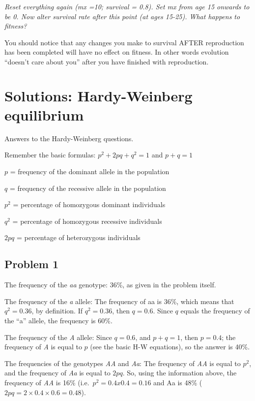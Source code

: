 \documentclass[
  a4paper]{book}
\begin{document}
\emph{Reset everything again (mx =10; survival = 0.8). Set mx from age 15 onwards to be 0. Now alter survival rate after this point (at ages 15-25). What happens to fitness?}

You should notice that any changes you make to survival AFTER reproduction has been completed will have no effect on fitness. In other words evolution ``doesn't care about you'' after you have finished with reproduction.

\section{Solutions: Hardy-Weinberg equilibrium}\label{solutions-hardy-weinberg-equilibrium}

Answers to the Hardy-Weinberg questions.

Remember the basic formulas:
\(p^2 + 2pq + q^2 = 1\) and \(p + q = 1\)

\(p\) = frequency of the dominant allele in the population

\(q\) = frequency of the recessive allele in the population

\(p^2\) = percentage of homozygous dominant individuals

\(q^2\) = percentage of homozygous recessive individuals

\(2pq\) = percentage of heterozygous individuals

\subsection{Problem 1}\label{problem-1}

The frequency of the \emph{aa} genotype: 36\%, as given in the problem itself.

The frequency of the \emph{a} allele: The frequency of aa is 36\%, which means that \(q^2 = 0.36\), by definition. If \(q^2 = 0.36\), then \(q = 0.6\). Since \(q\) equals the frequency of the ``a'' allele, the frequency is 60\%.

The frequency of the \emph{A} allele: Since \(q = 0.6\), and \(p + q = 1\), then \(p = 0.4\); the frequency of \emph{A} is equal to \(p\) (see the basic H-W equations), so the answer is 40\%.

The frequencies of the genotypes \emph{AA} and \emph{Aa}: The frequency of \emph{AA} is equal to \(p^2\), and the frequency of \emph{Aa} is equal to \(2pq\). So, using the information above, the frequency of \emph{AA} is 16\% (i.e.~\(p^2 = 0.4 x 0.4 = 0.16\) and Aa is 48\% (\(2pq = 2 \times 0.4 \times 0.6 = 0.48\)).
\end{document}
